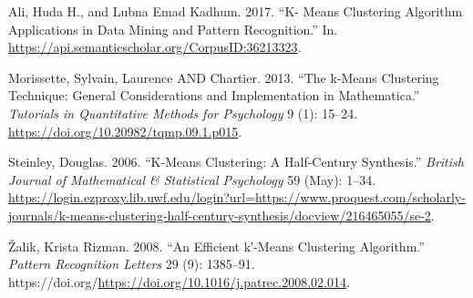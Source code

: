 \documentclass[
  letterpaper,
  DIV=11,
  numbers=noendperiod]{scrreprt}
\newlength{\cslhangindent}
\newlength{\cslentryspacingunit} %
\newenvironment{CSLReferences}[2] %
 {%
  \setlength{\parindent}{0pt}
  \ifodd #1
  \let\oldpar\par
  \def\par{\hangindent=\cslhangindent\oldpar}
  \fi
  \setlength{\parskip}{#2\cslentryspacingunit}
 }%
 {}
\begin{document}
\hypertarget{refs}{}
\begin{CSLReferences}{1}{0}
\leavevmode{}%
Ali, Huda H., and Lubna Emad Kadhum. 2017. {``K- Means Clustering
Algorithm Applications in Data Mining and Pattern Recognition.''} In.
\url{https://api.semanticscholar.org/CorpusID:36213323}.

\leavevmode{}%
Morissette, Sylvain, Laurence AND Chartier. 2013. {``The k-Means
Clustering Technique: General Considerations and Implementation in
Mathematica.''} \emph{Tutorials in Quantitative Methods for Psychology}
9 (1): 15--24. \url{https://doi.org/10.20982/tqmp.09.1.p015}.

\leavevmode{}%
Steinley, Douglas. 2006. {``K-Means Clustering: A Half-Century
Synthesis.''} \emph{British Journal of Mathematical \& Statistical
Psychology} 59 (May): 1--34.
\url{https://login.ezproxy.lib.uwf.edu/login?url=https://www.proquest.com/scholarly-journals/k-means-clustering-half-century-synthesis/docview/216465055/se-2}.

\leavevmode{}%
Žalik, Krista Rizman. 2008. {``An Efficient k′-Means Clustering
Algorithm.''} \emph{Pattern Recognition Letters} 29 (9): 1385--91.
https://doi.org/\url{https://doi.org/10.1016/j.patrec.2008.02.014}.

\end{CSLReferences}
\end{document}

